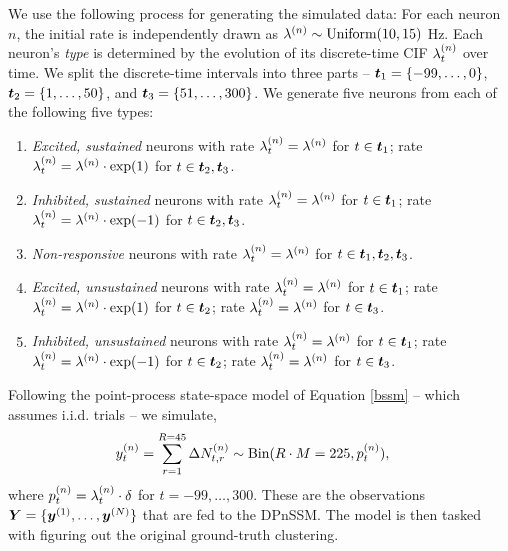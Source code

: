 \documentclass[twoside]{article}
\begin{document}
We use the following process for generating the simulated data:  For each neuron $n$, the initial rate is independently drawn as $\idx \lambda n \sim \text{Uniform}(10, 15)$ Hz.  Each neuron's \emph{type} is determined by the evolution of its discrete-time CIF  $\idx[t] \lambda n $ over time.  We split the discrete-time intervals into three parts -- $\bd t_1 = \{-99, \ldots, 0\}$, $\bd t_2 = \{1, \ldots, 50\}$, and $\bd t_3 = \{51, \ldots, 300\}$. We generate five neurons from each of the following five types: 
\begin{enumerate}
\item \emph{Excited, sustained} neurons with rate $\idx[t] \lambda n = \idx \lambda n$ for $t \in \bd t_1$; rate $\idx[t] \lambda n = \idx \lambda n \cdot \exp(1)$ for $t \in \bd t_2, \bd t_3$.
\item \emph{Inhibited, sustained} neurons with rate $\idx[t] \lambda n = \idx \lambda n$ for $t \in \bd t_1$; rate $\idx[t] \lambda n = \idx \lambda n \cdot \exp(-1)$ for $t \in \bd t_2, \bd t_3$.
\item \emph{Non-responsive} neurons with rate $\idx[t] \lambda n = \idx \lambda n$ for $t \in \bd t_1, \bd t_2, \bd t_3$.
\item \emph{Excited, unsustained} neurons with rate $\idx[t] \lambda n = \idx \lambda n$ for $t \in \bd t_1$; rate $\idx[t] \lambda n = \idx \lambda n \cdot \exp(1)$ for $t \in \bd t_2$; rate $\idx[t] \lambda n = \idx \lambda n$ for $t \in \bd t_3$.
\item \emph{Inhibited, unsustained} neurons with rate $\idx[t] \lambda n = \idx \lambda n$ for $t \in \bd t_1$; rate $\idx[t] \lambda n = \idx \lambda n \cdot \exp(-1)$ for $t \in \bd t_2$; rate $\idx[t] \lambda n = \idx \lambda n$ for $t \in \bd t_3$.
\end{enumerate}
Following the point-process state-space model of Equation \ref{bssm} -- which assumes i.i.d. trials -- we simulate, 
\begin{align}
\idx[t] y n = \sum_{r=1}^{R=45} \Delta \idx[t, r] N n &\sim \text{Bin}(R \cdot M = 225, \idx[t] p n),
\end{align}
where $\idx[t] p n = \idx[t] \lambda n \cdot \delta$ for $t = -99, \ldots, 300$.  These are the observations $\bd Y = \{\bidx y 1, \ldots, \bidx y N\}$ that are fed to the DPnSSM.  The model is then tasked with figuring out the original ground-truth clustering.
\end{document}
